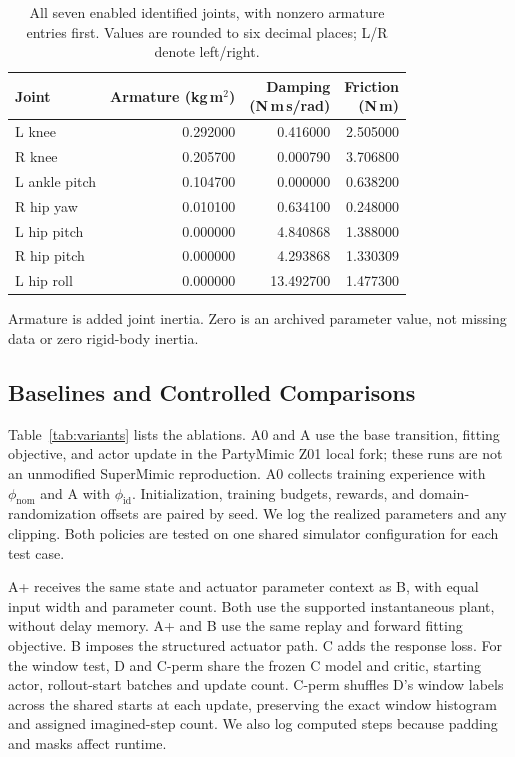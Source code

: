 \documentclass[letterpaper,10pt,conference]{ieeeconf}
\begin{document}
\begin{table}[t]
\centering
\caption{All seven enabled identified joints, with nonzero armature entries first. Values are rounded to six decimal places; L/R denote left/right.}
\label{tab:params}
\small
\setlength{\tabcolsep}{3pt}
\begin{tabular}{@{}lrrr@{}}
\toprule
Joint & \shortstack{Armature\\(kg\,m$^2$)} & \shortstack{Damping\\(N\,m\,s/rad)} & \shortstack{Friction\\(N\,m)} \\
\midrule
L knee & 0.292000 & 0.416000 & 2.505000 \\
R knee & 0.205700 & 0.000790 & 3.706800 \\
L ankle pitch & 0.104700 & 0.000000 & 0.638200 \\
R hip yaw & 0.010100 & 0.634100 & 0.248000 \\
\midrule
L hip pitch & 0.000000 & 4.840868 & 1.388000 \\
R hip pitch & 0.000000 & 4.293868 & 1.330309 \\
L hip roll & 0.000000 & 13.492700 & 1.477300 \\
\bottomrule
\end{tabular}

\vspace{3pt}
\parbox{0.98\columnwidth}{\footnotesize Armature is added joint inertia. Zero is an archived parameter value, not missing data or zero rigid-body inertia.}
\end{table}

\subsection{Baselines and Controlled Comparisons}
Table~\ref{tab:variants} lists the ablations. A0 and A use the base transition, fitting objective, and actor update in the PartyMimic Z01 local fork; these runs are not an unmodified SuperMimic reproduction. A0 collects training experience with $\phi_{\mathrm{nom}}$ and A with $\phi_{\mathrm{id}}$. Initialization, training budgets, rewards, and domain-randomization offsets are paired by seed. We log the realized parameters and any clipping. Both policies are tested on one shared simulator configuration for each test case.

A+ receives the same state and actuator parameter context as B, with equal input width and parameter count. Both use the supported instantaneous plant, without delay memory. A+ and B use the same replay and forward fitting objective. B imposes the structured actuator path. C adds the response loss. For the window test, D and C-perm share the frozen C model and critic, starting actor, rollout-start batches and update count. C-perm shuffles D's window labels across the shared starts at each update, preserving the exact window histogram and assigned imagined-step count. We also log computed steps because padding and masks affect runtime.
\end{document}
